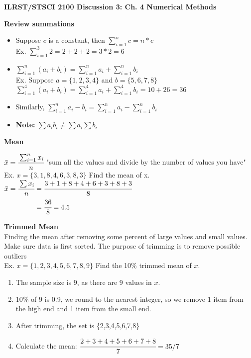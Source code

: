 \documentclass[12pt]{article}
\begin{document}
\begin{center}
\textbf{ILRST/STSCI 2100 Discussion 3: Ch. 4 Numerical Methods}
\end{center}

\noindent \textbf{Review summations}
\begin{itemize}
\item Suppose $c$ is a constant, then $\sum_{i=1}^{n} c = n*c$\\

\indent Ex. $\sum_{i=1}^3 2 = 2+2+2 = 3*2 = 6$ \\

\item $\sum_{i=1}^{n}( a_{i}+b_{i}) = \sum_{i=1}^{n}a_{i} + \sum_{i=1}^{n} b_{i}$ \\

\indent Ex. Suppose $a = \{1,2,3,4\}$ and $b=\{5,6,7,8\}$ \\
\indent $\sum_{i=1}^{4}(a_{i}+b_{i}) = \sum_{i=1}^{4}a_{i}+\sum_{i=1}^{4}b_{i}= 10 + 26 = 36$ \\
\item Similarly, $\sum_{i=1}^{n} a_{i} - b_{i} = \sum_{i=1}^{n} a_{i} - \sum_{i=1}^{n} b_{i}$ \\
\item \textbf{Note:} $\sum a_{i}b_{i} \neq \sum a_{i} \sum b_{i}$ 

\end{itemize}

\noindent \textbf{Mean}

$\bar{x} = \cfrac{\sum_{i=1}^{n} x_{i}}{n}$ \hspace{8pt} "sum all the values and divide by the number of values you have"\\

\noindent Ex. $x=\{3,1,8,4,6,3,8,3\}$ Find the mean of x.\\

$\begin{aligned}
\bar{x} = \cfrac{\sum x_{i}}{n} &= \cfrac{3+1+8+4+6+3+8+3}{8} \\
&=\cfrac{36}{8} = 4.5
\end{aligned}$

\noindent \textbf{Trimmed Mean} \\
Finding the mean after removing some percent of large values and small values. Make sure data is first sorted. The purpose of trimming is to remove possible outliers\\
\noindent Ex. $x=\{1,2,3,4,5,6,7,8,9\}$ Find the 10\% trimmed mean of $x$. 
\begin{enumerate}
\item The sample size is 9, as there are 9 values in $x$. 
\item 10\% of $9$ is 0.9, we round to the nearest integer, so we remove 1 item from the high end and 1 item from the small end.
\item After trimming, the set is \{2,3,4,5,6,7,8\}
\item Calculate the mean: $\cfrac{2+3+4+5+6+7+8}{7} = 35/7$
\end{enumerate}
\end{document}
